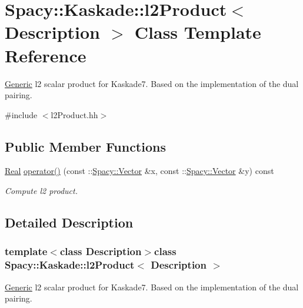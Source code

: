 \hypertarget{classSpacy_1_1Kaskade_1_1l2Product}{\section{Spacy\-:\-:Kaskade\-:\-:l2\-Product$<$ Description $>$ Class Template Reference}
\label{classSpacy_1_1Kaskade_1_1l2Product}
}


\hyperlink{namespaceSpacy_1_1Generic}{Generic} l2 scalar product for Kaskade7. Based on the implementation of the dual pairing.  




{\ttfamily \#include $<$l2\-Product.\-hh$>$}

\subsection*{Public Member Functions}
\begin{DoxyCompactItemize}
\item 
\hyperlink{classSpacy_1_1Real}{Real} \hyperlink{classSpacy_1_1Kaskade_1_1l2Product_a22732c1b32cd7eb8a1792440e7298002}{operator()} (const \-::\hyperlink{classSpacy_1_1Vector}{Spacy\-::\-Vector} \&x, const \-::\hyperlink{classSpacy_1_1Vector}{Spacy\-::\-Vector} \&y) const 
\begin{DoxyCompactList}\small\item\em Compute l2 product. \end{DoxyCompactList}\end{DoxyCompactItemize}


\subsection{Detailed Description}
\subsubsection*{template$<$class Description$>$class Spacy\-::\-Kaskade\-::l2\-Product$<$ Description $>$}

\hyperlink{namespaceSpacy_1_1Generic}{Generic} l2 scalar product for Kaskade7. Based on the implementation of the dual pairing. 

